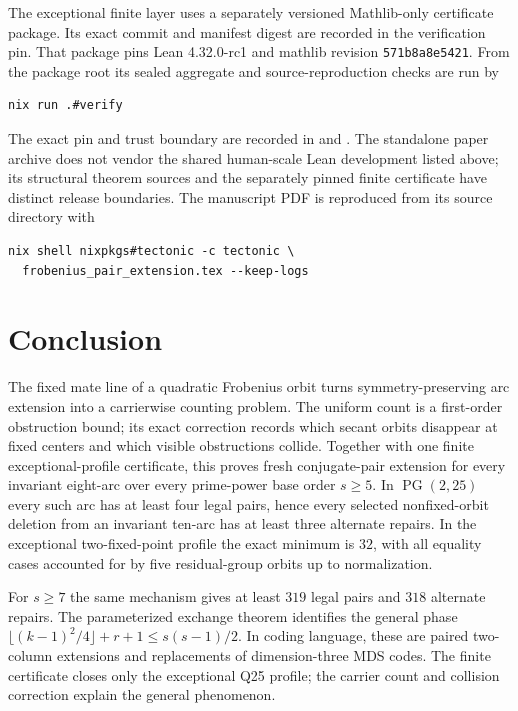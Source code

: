 \documentclass[11pt]{article}
\theoremstyle{definition}
\theoremstyle{remark}
\newcommand{\PG}{\operatorname{PG}}
\begin{document}
The exceptional finite layer uses a separately versioned Mathlib-only
certificate package.  Its exact commit and manifest digest are recorded in
the verification pin.
That package pins Lean 4.32.0-rc1 and mathlib revision
\texttt{571b8a8e5421}.  From the package root
its sealed aggregate and source-reproduction checks are run by
\begin{verbatim}
nix run .#verify
\end{verbatim}
The exact pin and trust boundary are recorded in
 and
.  The standalone paper archive does not vendor
the shared human-scale Lean development listed above; its structural theorem
sources and the separately pinned finite certificate have distinct release
boundaries.
The manuscript PDF is reproduced from its source directory with
\begin{verbatim}
nix shell nixpkgs#tectonic -c tectonic \
  frobenius_pair_extension.tex --keep-logs
\end{verbatim}

\clearpage
\section{Conclusion}

The fixed mate line of a quadratic Frobenius orbit turns symmetry-preserving
arc extension into a carrierwise counting problem.  The uniform count is a
first-order obstruction bound; its exact correction records which secant
orbits disappear at fixed centers and which visible obstructions collide.
Together with one finite exceptional-profile certificate, this proves
fresh conjugate-pair extension for every invariant eight-arc over every
prime-power base order $s\ge5$.  In $\PG(2,25)$ every such arc has at least
four legal pairs, hence every selected nonfixed-orbit deletion from an
invariant ten-arc has at least three alternate repairs.  In the exceptional
two-fixed-point profile the exact minimum is $32$, with all equality cases
accounted for by five residual-group orbits up to normalization.

For $s\ge7$ the same mechanism gives at least $319$ legal pairs and $318$
alternate repairs.  The parameterized exchange theorem identifies the
general phase
$\lfloor(k-1)^2/4\rfloor+r+1\le s(s-1)/2$.  In coding language, these are
paired two-column extensions and replacements of dimension-three MDS
codes.  The finite certificate closes only the exceptional Q25 profile; the
carrier count and collision correction explain the general phenomenon.
\end{document}
